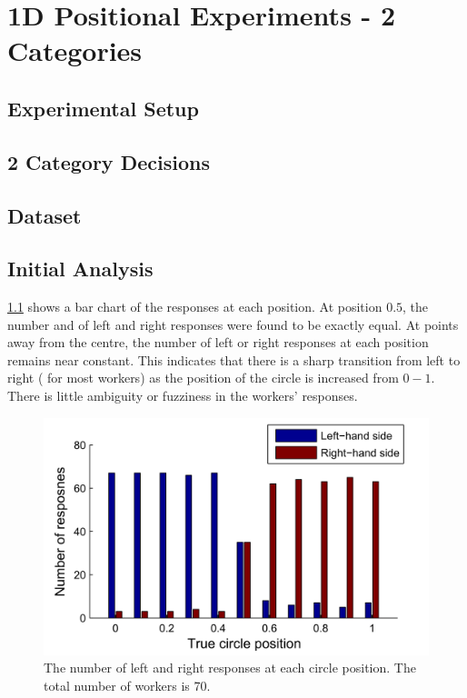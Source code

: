 \chapter{1D Positional Experiments - 2 Categories}

\section{Experimental Setup}

\section{2 Category Decisions}

\section{Dataset}

\section{Initial Analysis}

\ref{Figure:bar_responses_LR} shows a bar chart of the responses at each position. At position $0.5$, the number and of left and right responses were found to be exactly equal. At points away from the centre, the number of left or right responses at each position remains near constant. This indicates that there is a sharp transition from left to right ( for most workers) as the position of the circle is increased from $0 - 1$. There is little ambiguity or fuzziness in the workers' responses. 


\begin{figure}
	\centering
	\includegraphics[scale=1]{bar_responsesLR.png}
	\caption{The number of left and right responses at each circle position. The total number of workers is 70.}
	\label{Figure:bar_responses_LR}
\end{figure}


